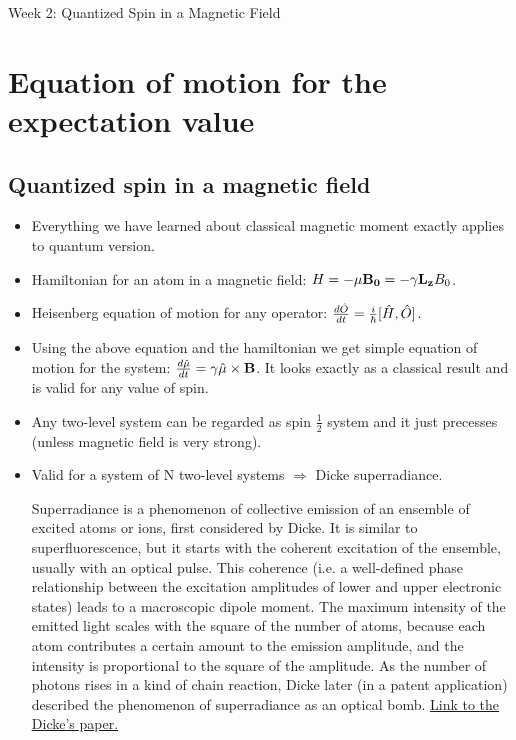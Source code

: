 \documentclass[AtomicOptical1Notes.tex]{subfiles}
\begin{document}
\begin{center}\huge Week 2: Quantized Spin in a Magnetic Field\end{center}

\section{Equation of motion for the expectation value}

	\subsection{Quantized spin in a magnetic field}
		\begin{itemize}
			\item Everything we have learned about classical magnetic moment exactly applies to quantum version.
			\item Hamiltonian for an atom in a magnetic field: $ H=-\mathbf{\mu}\mathbf{B_0}=-\gamma\mathbf{L_z}B_0 $.
			\item Heisenberg equation of motion for any operator: $ \frac{d \hat{O}}{d t}=\frac{i}{\hbar}[\hat{H},\hat{O}] $.
			\item Using the above equation and the hamiltonian we get simple equation of motion for the system: $ \frac{d \hat{\mu}}{d t}=\gamma\hat{\mu}\times\mathbf{B} $. It looks exactly as a classical result and is valid for any value of spin.
			\item Any two-level system can be regarded as spin $\frac{1}{2}$ system and it just precesses (unless magnetic field is very strong).
			\item Valid for a system of N two-level systems $\Rightarrow$ Dicke superradiance.

Superradiance is a phenomenon of collective emission of an ensemble of excited atoms or ions, first considered by Dicke. It is similar to superfluorescence, but it starts with the coherent excitation of the ensemble, usually with an optical pulse. This coherence (i.e. a well-defined phase relationship between the excitation amplitudes of lower and upper electronic states) leads to a macroscopic dipole moment. The maximum intensity of the emitted light scales with the square of the number of atoms, because each atom contributes a certain amount to the emission amplitude, and the intensity is proportional to the square of the amplitude. As the number of photons rises in a kind of chain reaction, Dicke later (in a patent application) described the phenomenon of superradiance as an optical bomb. \href{https://www.clear.rice.edu/elec603/spring2008/Selecting_a_Paper_files/Physical%20Review%201954%20Dicke.pdf}{\color{blue} \underline{Link to the Dicke's paper.}}
		\end{itemize}
		
\end{document}
